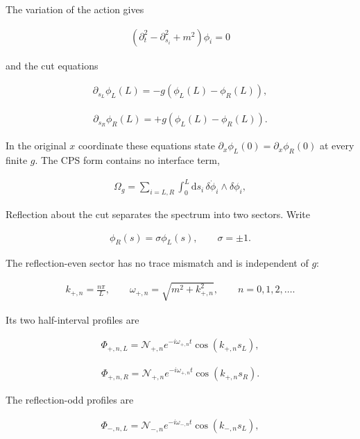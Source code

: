 The variation of the action gives

\begin{align}
(\partial_t^2-\partial_{s_i}^2+m^2)\phi_i=0
\end{align}

and the cut equations

\begin{align}
\partial_{s_L}\phi_L(L)
=-g\left(\phi_L(L)-\phi_R(L)\right),
\end{align}

\begin{align}
\partial_{s_R}\phi_R(L)
=+g\left(\phi_L(L)-\phi_R(L)\right).
\end{align}

In the original $x$ coordinate these equations state $\partial_x\phi_L(0)=\partial_x\phi_R(0)$ at every finite $g$. The CPS form contains no interface term,

\begin{align}
\Omega_g
=\sum_{i=L,R}\int_0^L\mathrm ds_i\,
\delta\dot\phi_i\wedge\delta\phi_i,
\end{align}

Reflection about the cut separates the spectrum into two sectors. Write

\begin{align}
\phi_R(s)=\sigma\phi_L(s),
\qquad
\sigma=\pm1.
\end{align}

The reflection-even sector has no trace mismatch and is independent of $g$:

\begin{align}
k_{+,n}=\frac{n\pi}{L},
\qquad
\omega_{+,n}=\sqrt{m^2+k_{+,n}^2},
\qquad
n=0,1,2,\ldots.
\end{align}

Its two half-interval profiles are

\begin{align}
\Phi_{+,n,L}
=\mathcal N_{+,n}e^{-i\omega_{+,n}t}
\cos(k_{+,n}s_L),
\end{align}

\begin{align}
\Phi_{+,n,R}
=\mathcal N_{+,n}e^{-i\omega_{+,n}t}
\cos(k_{+,n}s_R).
\end{align}

The reflection-odd profiles are

\begin{align}
\Phi_{-,n,L}
=\mathcal N_{-,n}e^{-i\omega_{-,n}t}
\cos(k_{-,n}s_L),
\end{align}

